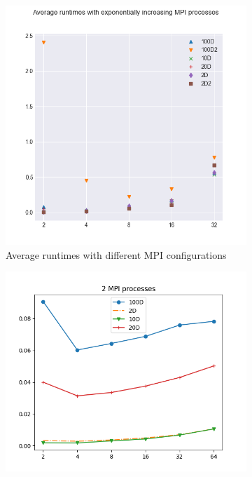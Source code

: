 \documentclass{article}
\begin{document}
\begin{figure}[p]
    \centering
    \begin{subfigure}{0.40\textwidth}
        \includegraphics[width=\textwidth]{png/Average-runtimes.png}
        \caption{Average runtimes with different MPI configurations}
        \label{fig:image1}
    \end{subfigure}
    \begin{subfigure}{0.40\textwidth}
        \includegraphics[width=\textwidth]{png/2MPIprocesses-smallTestFiles.png}

\end{subfigure}
\end{figure}
\end{document}
